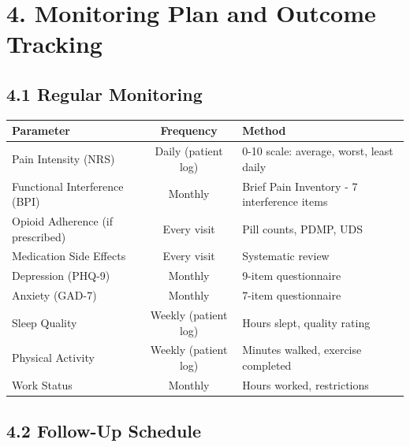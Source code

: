 \documentclass[11pt,letterpaper]{article}
\begin{document}
\section*{4. Monitoring Plan and Outcome Tracking}

\subsection*{4.1 Regular Monitoring}

\begin{tabularx}{\textwidth}{|l|c|X|}
\hline
\textbf{Parameter} & \textbf{Frequency} & \textbf{Method} \\ \hline
Pain Intensity (NRS) & Daily (patient log) & 0-10 scale: average, worst, least daily \\ \hline
Functional Interference (BPI) & Monthly & Brief Pain Inventory - 7 interference items \\ \hline
Opioid Adherence (if prescribed) & Every visit & Pill counts, PDMP, UDS \\ \hline
Medication Side Effects & Every visit & Systematic review \\ \hline
Depression (PHQ-9) & Monthly & 9-item questionnaire \\ \hline
Anxiety (GAD-7) & Monthly & 7-item questionnaire \\ \hline
Sleep Quality & Weekly (patient log) & Hours slept, quality rating \\ \hline
Physical Activity & Weekly (patient log) & Minutes walked, exercise completed \\ \hline
Work Status & Monthly & Hours worked, restrictions \\ \hline
\end{tabularx}

\subsection*{4.2 Follow-Up Schedule}
\end{document}
